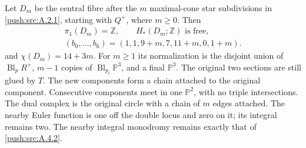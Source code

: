 \begin{proposition}\label{push:src:A.4.6}\label{push:A46}
Let $D_m$ be the central fibre after the $m$ maximal-cone
star subdivisions in \ref{push:src:A.2.1}, starting with $Q^+$, where
$m\geq0$. Then
\[
 \begin{gathered}
 \pi_1(D_m)=\mathbb Z,\qquad
 H_*(D_m;\mathbb Z)\text{ is free},\\
 (b_0,\ldots,b_6)=(1,1,9+m,7,11+m,0,1+m).
 \end{gathered}
\]
and $\chi(D_m)=14+3m$. For $m\geq1$ its normalization is
the disjoint union of $\operatorname{Bl}_pR^+$, $m-1$
copies of $\operatorname{Bl}_{p_i}\mathbb P^3$, and a final
$\mathbb P^3$. The original two sections are still glued
by $T$. The new components form a chain attached to the
original component. Consecutive components meet in one
$\mathbb P^2$, with no triple intersections. The dual
complex is the original circle with a chain of $m$ edges
attached. The nearby Euler function is one off the double
locus and zero on it; its integral remains two. The nearby
integral monodromy remains exactly that of \ref{push:src:A.4.2}.
\end{proposition}

